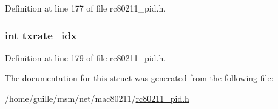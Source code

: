 Definition at line 177 of file rc80211\-\_\-pid.\-h.

\hypertarget{structrc__pid__sta__info_aaebb07f300f4c11055b26d9ac44b8cfc}{
\subsubsection[{txrate\-\_\-idx}]{\setlength{\rightskip}{0pt plus 5cm}int txrate\-\_\-idx}}\label{structrc__pid__sta__info_aaebb07f300f4c11055b26d9ac44b8cfc}


Definition at line 179 of file rc80211\-\_\-pid.\-h.



The documentation for this struct was generated from the following file\-:\begin{DoxyCompactItemize}
\item 
/home/guille/msm/net/mac80211/\hyperlink{rc80211__pid_8h}{rc80211\-\_\-pid.\-h}\end{DoxyCompactItemize}

